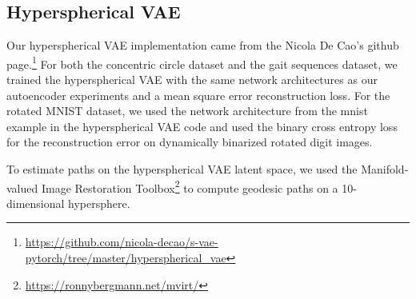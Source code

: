 \documentclass[letterpaper]{article} %
\begin{document}
\subsection{Hyperspherical VAE}\label{sec:hvae}
Our hyperspherical VAE implementation came from the Nicola De Cao's github page.\footnote{\url{https://github.com/nicola-decao/s-vae-pytorch/tree/master/hyperspherical_vae}} For both the concentric circle dataset and the gait sequences dataset, we trained the hyperspherical VAE with the same network architectures as our autoencoder experiments and a mean square error reconstruction loss. For the rotated MNIST dataset, we used the network architecture from the mnist example in the hyperspherical VAE code and used the binary cross entropy loss for the reconstruction error on dynamically binarized rotated digit images.

To estimate paths on the hyperspherical VAE latent space, we used the Manifold-valued Image Restoration Toolbox\footnote{\url{https://ronnybergmann.net/mvirt/}} to compute geodesic paths on a 10-dimensional hypersphere.
\end{document}

